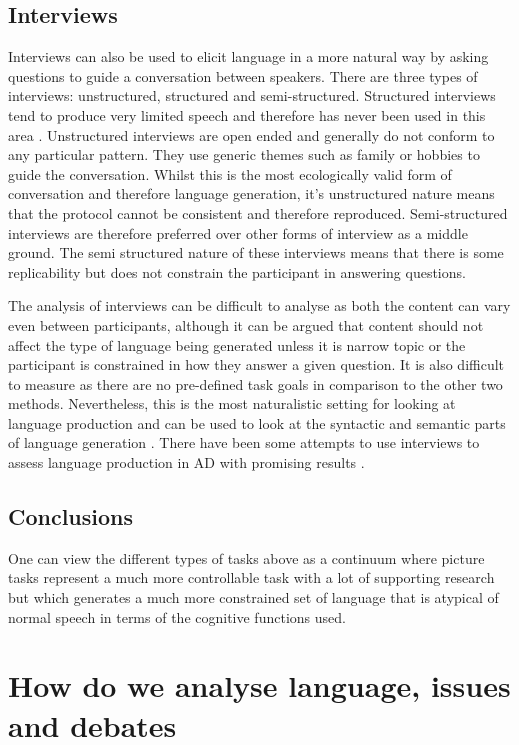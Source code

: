 \documentclass[10pt, letterpaper, twoside, openany]{book}
\begin{document}
\subsection{Interviews}
Interviews can also be used to elicit language in a more natural way by asking questions to guide a conversation between speakers. There are three types of interviews: unstructured, structured and semi-structured. Structured interviews tend to produce very limited speech and therefore has never been used in this area \cite{Boschi2017}. Unstructured interviews are open ended and generally do not conform to any particular pattern. They use generic themes such as family or hobbies to guide the conversation. Whilst this is the most ecologically valid form of conversation and therefore language generation, it's unstructured nature means that the protocol cannot be consistent and therefore reproduced. Semi-structured interviews are therefore preferred over other forms of interview as a middle ground. The semi structured nature of these interviews means that there is some replicability but does not constrain the participant in answering questions.
\par
The analysis of interviews can be difficult to analyse as both the content can vary even between participants, although it can be argued that content should not affect the type of language being generated unless it is narrow topic or the participant is constrained in how they answer a given question. It is also difficult to measure as there are no pre-defined task goals in comparison to the other two methods. Nevertheless, this is the most naturalistic setting for looking at language production and can be used to look at the syntactic and semantic parts of language generation \cite{Sajjadi2012}. There have been some attempts to use interviews to assess language production in AD with promising results \cite{Asgari2017, Guinn2015}.
\par
\subsection{Conclusions}
One can view the different types of tasks above as a continuum where picture tasks represent a much more controllable task with a lot of supporting research but which generates a much more constrained set of language that is atypical of normal speech in terms of the cognitive functions used. 

\section{How do we analyse language, issues and debates}
\end{document}
